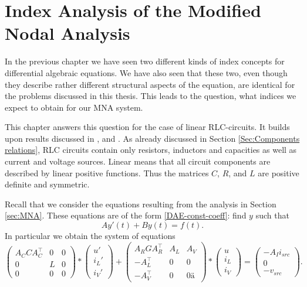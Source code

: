 \chapter{Index Analysis of the Modified Nodal Analysis}
\label{sec:index analysis of the modified nodal analysis}


In the previous chapter we have seen two different kinds of index concepts for differential algebraic equations. We have also seen that these two, even though they describe rather different structural aspects of the equation, are identical for the problems discussed in this thesis. %
This leads to the question, what indices we expect to obtain for our MNA system.

This chapter answers this question for the case of linear RLC-circuits. It builds upon results discussed in \cite{ModellingAndDiscretizationOfCircuitProblems}, \cite{NumerikGewöhnlicherDifferentialgleichungen} and \cite{shashkov_tuprints27452}.
As already discussed in Section \ref{Sec:Components relations}, RLC circuits contain only resistors, inductors and capacities as well as current and voltage sources. Linear means that all circuit components are described by linear positive functions. Thus the matrices $C$, $R$, and $L$ are positive definite and symmetric.

Recall that we consider the equations resulting from the analysis in Section \ref{sec:MNA}. These equations are of the form \eqref{DAE-const-coeff}: find $y$ such that
\begin{displaymath}
	A y'(t) + B y(t) = f(t).
\end{displaymath}
In particular we obtain the system of equations
\begin{displaymath}
	\begin{pmatrix}
		A_C C A_C^\top & 0 & 0 \\
		0 & L & 0 \\
		0 & 0 & 0
	\end{pmatrix}
	*
	\begin{pmatrix}
		u' \\
		i_L' \\
		i_V'
	\end{pmatrix}
	+
	\begin{pmatrix}
		A_R G A_R^\top & A_L & A_V \\
		-A_L^\top & 0 & 0 \\
		-A_V^\top & 0 & 0 ä
	\end{pmatrix}
	*
	\begin{pmatrix}
		u \\
		i_L \\
		i_V
	\end{pmatrix}
	=
	\begin{pmatrix}
		-A_I i_{src} \\
		0 \\
		-v_{src}
	\end{pmatrix}.
\end{displaymath}

